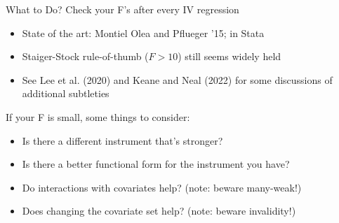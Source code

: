 \documentclass{beamer}
\begin{document}
\begin{frame}{What to Do?}
Check your F's after every IV regression\smallskip
\begin{itemize}
\item State of the art: Montiel Olea and Pflueger '15;  in Stata\smallskip
\item Staiger-Stock rule-of-thumb ($F>10$) still seems widely held\smallskip
\item See Lee et al. (2020) and Keane and Neal (2022) for some discussions of additional subtleties
\end{itemize}
\bigskip

If your F is small, some things to consider:\smallskip
\begin{itemize}
\item Is there a different instrument that's stronger?\smallskip
\item Is there a better functional form for the instrument you have?\smallskip
\item Do interactions with covariates help? (note: beware many-weak!)\smallskip
\item Does changing the covariate set help? (note: beware invalidity!)
\end{itemize}
\end{frame}
\end{document}
